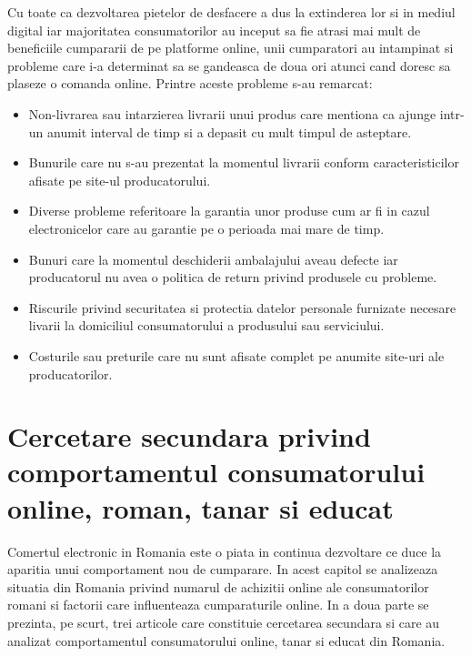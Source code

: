 \documentclass[a4paper, 12pt]{article}
\begin{document}
		\quad Cu toate ca dezvoltarea pietelor de desfacere a dus la extinderea lor si in mediul digital iar majoritatea consumatorilor au inceput sa fie atrasi mai mult de beneficiile cumpararii de pe platforme online, unii cumparatori au intampinat si probleme care i-a determinat sa se gandeasca de doua ori atunci cand doresc sa plaseze o comanda online. Printre aceste probleme s-au remarcat: 
		\begin{itemize}
			\renewcommand{\labelitemi}{$\Rightarrow$}
			\item Non-livrarea sau intarzierea livrarii unui produs care mentiona ca ajunge intr-un anumit interval de timp si a depasit cu mult timpul de asteptare. 
			\item Bunurile care nu s-au prezentat la momentul livrarii conform caracteristicilor afisate pe site-ul producatorului.
			\item Diverse probleme referitoare la garantia unor produse cum ar fi in cazul electronicelor care au garantie pe o perioada mai mare de timp.
			\item  Bunuri care la momentul deschiderii ambalajului aveau defecte iar producatorul nu avea o politica de return privind produsele cu probleme.
			\item Riscurile privind securitatea si protectia datelor personale furnizate necesare livarii la domiciliul consumatorului a produsului sau serviciului.
			\item Costurile sau preturile care nu sunt afisate complet pe anumite site-uri ale producatorilor.
		\end{itemize}
	\newpage
	\section{Cercetare secundara privind comportamentul consumatorului online, roman, tanar si educat}
	
	\quad\quad Comertul electronic in Romania este o piata in continua dezvoltare ce duce la aparitia unui comportament nou de cumparare. In acest capitol se analizeaza situatia din Romania privind numarul de achizitii online ale consumatorilor romani si factorii care influenteaza cumparaturile online. In a doua parte se prezinta, pe scurt, trei articole care constituie cercetarea secundara si care au analizat comportamentul consumatorului online, tanar si educat din Romania.
	
\end{document}
